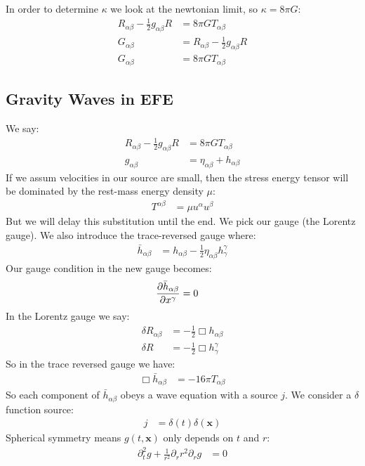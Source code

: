 In order to determine $\kappa$ we look at the newtonian limit, so $\kappa = 8\pi G$:
\begin{align*}
	R_{\alpha\beta} - \frac{1}{2} g_{\alpha\beta} R  &= 8\pi G T_{\alpha\beta} \\
	G_{\alpha\beta} &= R_{\alpha\beta} - \frac{1}{2} g_{\alpha\beta} R \\
	G_{\alpha\beta} &= 8\pi G T_{\alpha\beta}
\end{align*}
\subsection{Gravity Waves in EFE}
We say:
\begin{align*}
	R_{\alpha\beta} - \frac{1}{2} g_{\alpha\beta} R  &= 8\pi G T_{\alpha\beta} \\
	g_{\alpha\beta} &= \eta_{\alpha\beta} + h_{\alpha\beta}
\end{align*}
If we assum velocities in our source are small, then the stress energy tensor will be dominated by the rest-mass energy density $\mu$:
\begin{align*}
	T^{\alpha\beta} &= \mu u^\alpha u^\beta
\end{align*}
But we will delay this substitution until the end. We pick our gauge (the Lorentz gauge). We also introduce the trace-reversed gauge where:
\begin{align*}
	\bar{h}_{\alpha\beta} &= h_{\alpha\beta} - \frac{1}{2}\eta_{\alpha\beta} h^\gamma_\gamma
\end{align*}
Our gauge condition in the new gauge becomes:
\begin{align*}
	\frac{\partial \bar{h}_{\alpha\beta}}{\partial x^\gamma} &= 0
\end{align*}
In the Lorentz gauge we say:
\begin{align*}
	\delta R_{\alpha\beta} &= -\frac{1}{2}\Box h_{\alpha\beta} \\
	\delta R &= -\frac{1}{2}\Box h_\gamma^\gamma
\end{align*}
So in the trace reversed gauge we have:
\begin{align*}
	\Box \bar{h}_{\alpha\beta} &= -16\pi T_{\alpha\beta}
\end{align*}
So each component of $\bar{h}_{\alpha\beta}$ obeys a wave equation with a source $j$. We consider a $\delta$ function source:
\begin{align*}
	j &= \delta(t)\delta(\bm{x})
\end{align*}
Spherical symmetry means $g(t,\bm{x})$ only depends on $t$ and $r$:
\begin{align*}
	\partial_t^2 g + \frac{1}{r^2} \partial_r r^2\partial_r g &= 0
\end{align*}

